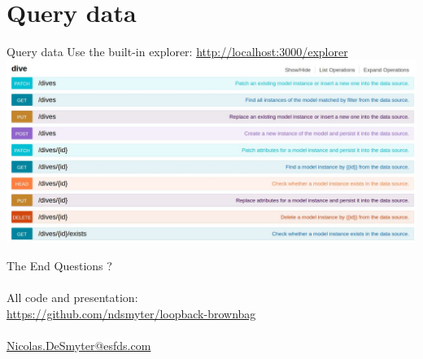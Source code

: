 \documentclass[11pt]{beamer}
\begin{document}
\section{Query data}
\begin{frame}{Query data}
Use the built-in explorer: \url{http://localhost:3000/explorer}\\
\includegraphics[width=\textwidth]{images/explorer-overview.jpg} 
\end{frame}

\begin{frame}{The End}
Questions ?\\
~\\
All code and presentation:\\
\url{https://github.com/ndsmyter/loopback-brownbag}\\
~\\
\hyperref[mailto:Nicolas.DeSmyter@esfds.com]{Nicolas.DeSmyter@esfds.com}
\end{frame}
\end{document}
